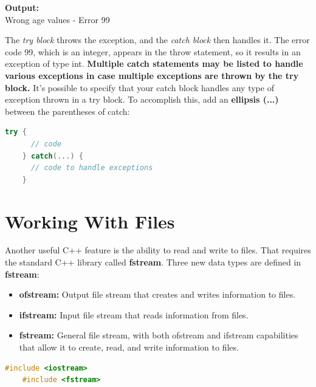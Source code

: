 \documentclass[12pt , a4paper]{article}
\begin{document}
	\begin{tcolorbox}
	\textbf{Output:}\\
	Wrong age values - Error 99
	\end{tcolorbox}
	The \emph{try block} throws the exception, and the \emph{catch block} then handles it.
	The error code 99, which is an integer, appears in the throw statement, so it results in an exception of type int.
	\textbf{Multiple catch statements may be listed to handle various exceptions in case multiple exceptions are thrown by the try block.}
	It's possible to specify that your catch block handles any type of exception thrown in a try block. To accomplish this, add an \textbf{ellipsis (...)} between the parentheses of catch:
	\begin{lstlisting}[language=C++]
	try {
	  // code
	} catch(...) {
	  // code to handle exceptions
	}		
	\end{lstlisting}
%
%
\section{Working With Files}
	Another useful C++ feature is the ability to read and write to files. That requires the standard C++ library called \textbf{fstream}.
	Three new data types are defined in \textbf{fstream}:
	\begin{itemize}
		\item \textbf{ofstream:} Output file stream that creates and writes information to files. \\
		\item \textbf{ifstream:} Input file stream that reads information from files.  \\
		\item \textbf{fstream:}  General file stream, with both ofstream and ifstream capabilities that allow it to create, read, and write information to files. 
	\end{itemize}
	\begin{lstlisting}[language=C++]
	#include <iostream>
	#include <fstream>	
	\end{lstlisting}
\end{document}
